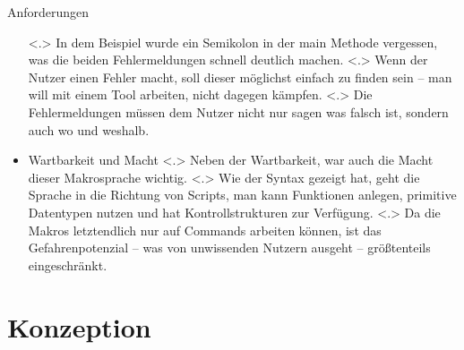 \begin{frame}{Anforderungen}
\begin{itemize}
\begin{uncoverenv}
%
        \end{uncoverenv}
            \note[item]<.>{
              In dem Beispiel wurde ein Semikolon in der main Methode vergessen, was die beiden Fehlermeldungen schnell deutlich machen.
            }
            \note[item]<.>{
              Wenn der Nutzer einen Fehler macht, soll dieser möglichst einfach zu finden sein -- man will mit einem Tool arbeiten, nicht dagegen kämpfen.
            }
            \note[item]<.>{
              Die Fehlermeldungen müssen dem Nutzer nicht nur sagen was falsch ist, sondern auch wo und weshalb.
            }
      \item<+- | alert@+>
        Wartbarkeit und Macht
            \note[item]<.>{
              Neben der Wartbarkeit, war auch die Macht dieser Makrosprache wichtig.
            }
            \note[item]<.>{
              Wie der Syntax gezeigt hat, geht die Sprache in die Richtung von Scripts, man kann Funktionen anlegen, primitive Datentypen nutzen und hat Kontrollstrukturen zur Verfügung.
            }
            \note[item]<.>{
              Da die Makros letztendlich nur auf Commands arbeiten können, ist das Gefahrenpotenzial -- was von unwissenden Nutzern ausgeht -- größtenteils eingeschränkt.
            }
    \end{itemize}
  \end{frame}

\section{Konzeption}

